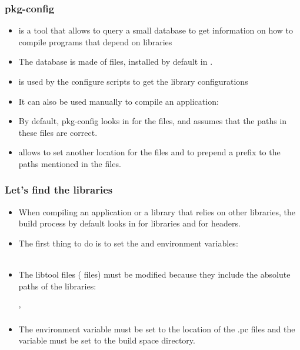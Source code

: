 \begin{frame}
  \frametitle{pkg-config}
  \begin{itemize}
  \item {} is a tool that allows to query a small
    database to get information on how to compile programs that depend
    on libraries
  \item The database is made of  files, installed by default in
    .
  \item {} is used by the configure scripts to get the
    library configurations
  \item It can also be used manually to compile an application:\\
  \item By default, pkg-config looks in  for
    the  files, and assumes that the paths in these files
    are correct.
  \item {} allows to set another location for the
     files and  to prepend a
    prefix to the paths mentioned in the  files.
  \end{itemize}
\end{frame}

\begin{frame}
  \frametitle{Let's find the libraries}
  \begin{itemize}
  \item When compiling an application or a library that relies on
    other libraries, the build process by default looks in
     for libraries and  for headers.
  \item The first thing to do is to set the  and
     environment
    variables:\\
    \\
  \item The libtool files ( files) must be modified because they
    include the absolute paths of the libraries:\\
    \\
    '
  \item The  environment variable must be set to
    the location of the .pc files and the
     variable must be set to the build
    space directory.
\end{itemize}
\end{frame}

